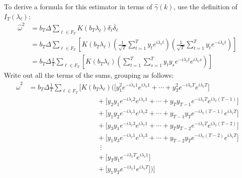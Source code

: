\documentclass[12pt]{article}
\theoremstyle{plain}
\theoremstyle{definition}
\theoremstyle{remark}
\newcommand{\sumtT}{\sum^T_{t=1}}
\begin{document}
To derive a formula for this estimator in terms of $\hat{\gamma}(k)$,
use the definition of $I_T(\lambda_\ell)$:
\begin{align*}
  \hat{\omega}^2
  &=
  b_T
  \Delta
  \sum_{\ell\in F_T}
  K(b_T\lambda_\ell)
  \delta_\ell
  \overline{\delta}_\ell
  \\
  &=
  b_T
  \Delta
  \sum_{\ell\in F_T}
  \left[
  K(b_T\lambda_\ell)
  \left(
  \frac{1}{\sqrt{T}}
  \sumtT y_te^{i\lambda_\ell t}
  \right)
  \left(
  \frac{1}{\sqrt{T}}
  \sumtT y_te^{-i\lambda_\ell t}
  \right)
  \right]
  \\
  &=
  b_T
  \Delta
  \frac{1}{T}
  \sum_{\ell\in F_T}
  \left[
    K(b_T\lambda_\ell)
  \left(
  \sumtT
  \sum_{s=1}^T
  y_ty_s
  e^{-i\lambda_\ell t}
  e^{i\lambda_\ell s}
  \right)\right]
\end{align*}
Write out all the terms of the sums, grouping as follows:
\begin{align*}
  \hat{\omega}^2
  &=
  b_T
  \Delta
  \frac{1}{T}
  \sum_{\ell\in F_T}
  \bigg[
    K(b_T\lambda_\ell)
  \bigg(
  \big[
    y_1^2e^{-i\lambda_\ell 1}e^{i\lambda_\ell 1}
    +
    \cdots
    +
    y_T^2e^{-i\lambda_\ell T}e^{i\lambda_\ell T}
  \big]
  \\
  &\quad\qquad\qquad\qquad\qquad\quad
  +
  \big[
    y_2y_1
    e^{-i\lambda_\ell 2}e^{i\lambda_\ell 1}
    +
    \cdots
    +
    y_{T}y_{T-1}
    e^{-i\lambda_\ell T}e^{i\lambda_\ell (T-1)}
  \big]
  \\
  &\quad\qquad\qquad\qquad\qquad\quad
  +
  \big[
    y_1y_2
    e^{-i\lambda_\ell 1}e^{i\lambda_\ell 2}
    +
    \cdots
    +
    y_{T-1}y_T
    e^{-i\lambda_\ell (T-1)}e^{i\lambda_\ell T}
  \big]
  \\
  &\quad\qquad\qquad\qquad\qquad\quad
  +
  \big[
    y_3y_1
    e^{-i\lambda_\ell 3}e^{i\lambda_\ell 1}
    +
    \cdots
    +
    y_{T}y_{T-2}
    e^{-i\lambda_\ell T}e^{i\lambda_\ell (T-2)}
  \big]
  \\
  &\quad\qquad\qquad\qquad\qquad\quad
  +
  \big[
    y_1y_3
    e^{-i\lambda_\ell 1}e^{i\lambda_\ell 3}
    +
    \cdots
    +
    y_{T-2}y_T
    e^{-i\lambda_\ell (T-2)}e^{i\lambda_\ell T}
  \big]
  \\
  &\quad\qquad\qquad\qquad\qquad\quad
  \;\,\vdots
  \\
  &\quad\qquad\qquad\qquad\qquad\quad
  +
  \big[
    y_Ty_1
    e^{-i\lambda_\ell T}e^{i\lambda_\ell 1}
  \big]
  \\
  &\quad\qquad\qquad\qquad\qquad\quad
  +
  \big[
    y_1y_T
    e^{-i\lambda_\ell 1}e^{i\lambda_\ell T}
  \big]
  \bigg)
  \bigg]
\end{align*}
\end{document}
